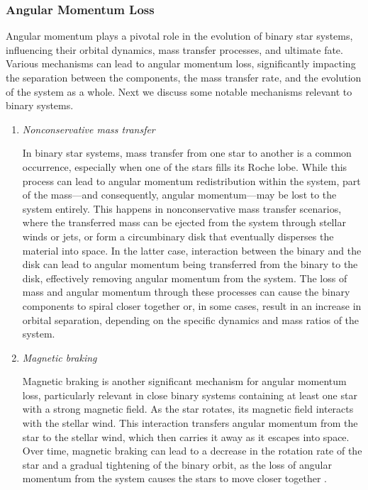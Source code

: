 \documentclass[main.tex]{subfiles}
\begin{document}
    \subsubsection{Angular Momentum Loss}
    Angular momentum plays a pivotal role in the evolution of binary star systems, influencing their orbital dynamics, mass transfer processes, and ultimate fate. Various mechanisms can lead to angular momentum loss, significantly impacting the separation between the components, the mass transfer rate, and the evolution of the system as a whole. Next we discuss some notable mechanisms relevant to binary systems.
    \begin{enumerate}
        \item \textit{Nonconservative mass transfer}
        
        In binary star systems, mass transfer from one star to another is a common occurrence, especially when one of the stars fills its Roche lobe. While this process can lead to angular momentum redistribution within the system, part of the mass---and consequently, angular momentum---may be lost to the system entirely. This happens in nonconservative mass transfer scenarios, where the transferred mass can be ejected from the system through stellar winds or jets, or form a circumbinary disk that eventually disperses the material into space. In the latter case, interaction between the binary and the disk can lead to angular momentum being transferred from the binary to the disk, effectively removing angular momentum from the system. The loss of mass and angular momentum through these processes can cause the binary components to spiral closer together or, in some cases, result in an increase in orbital separation, depending on the specific dynamics and mass ratios of the system.

        \item \textit{Magnetic braking}

        Magnetic braking is another significant mechanism for angular momentum loss, particularly relevant in close binary systems containing at least one star with a strong magnetic field. As the star rotates, its magnetic field interacts with the stellar wind. This interaction transfers angular momentum from the star to the stellar wind, which then carries it away as it escapes into space. Over time, magnetic braking can lead to a decrease in the rotation rate of the star and a gradual tightening of the binary orbit, as the loss of angular momentum from the system causes the stars to move closer together \citep[e.g.,][]{Gossage_2023}.


\end{enumerate}
\end{document}
